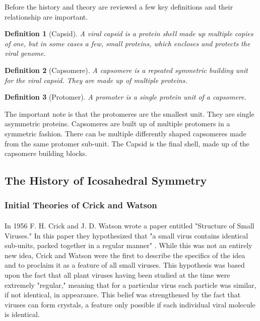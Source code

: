 \documentclass[12pt,letter]{article}
\newtheorem*{definition*}{Definition}
\begin{document}
Before the history and theory are reviewed a few key definitions and their relationship are important.

\begin{definition*}[Capsid]
A viral capsid is a protein shell made up multiple copies of one, but in some cases a few, small proteins, which encloses and protects the viral genome.
\end{definition*}
\begin{definition*}[Capsomere]
A capsomere is a repeated symmetric building unit for the viral capsid. They are made up of multiple proteins.
\end{definition*}
\begin{definition*}[Protomer]
A promoter is a single protein unit of a capsomere.
\end{definition*}

The important note is that the protomeres are the smallest unit. They are single asymmetric proteins. Capsomeres are built up of multiple protomers in a symmetric fashion. There can be multiple differently shaped capsomeres made from the same protomer sub-unit. The Capsid is the final shell, made up of the capsomere building blocks.

\subsection{The History of Icosahedral Symmetry} %

\subsubsection{Initial Theories of Crick and Watson}
\paragraph{}
In 1956  F. H. Crick and J. D. Watson wrote a paper entitled "Structure of Small Viruses." In this paper they hypothesized that "a small virus contains identical sub-units, packed together in a regular manner" \cite[p 473]{Crick:1956}. While this was not an entirely new idea, Crick and Watson were the first to describe the specifics of the idea and to proclaim it as a feature of all small viruses. This hypothesis was based upon the fact that all plant viruses having been studied at the time were extremely "regular," meaning that for a particular virus each particle was similar, if not identical, in appearance. This belief was strengthened by the fact that viruses can form crystals, a feature only possible if each individual viral molecule is identical.
\end{document}
